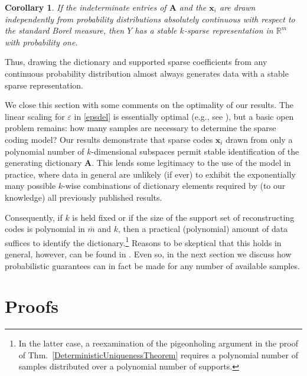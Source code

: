 \documentclass[journal, twocolumn]{IEEEtran}
\newtheorem{corollary}{Corollary}
\begin{document}
\begin{corollary}\label{ProbabilisticCor}
If the indeterminate entries of $\mathbf{A}$ and the $\mathbf{x}_i$ are drawn independently from probability distributions absolutely continuous with respect to the standard Borel measure, then $Y$ has a stable $k$-sparse representation in $\mathbb{R}^m$ with probability one.
\end{corollary}

Thus, drawing the dictionary and supported sparse coefficients from any continuous probability distribution almost always generates data with a stable sparse representation.


We close this section with some comments on the optimality of our results.  The linear scaling for $\varepsilon$ in \eqref{epsdel} is essentially optimal (e.g., see \cite{arias2013fundamental}), but a basic open problem remains: how many samples are necessary to determine the sparse coding model? 
Our results demonstrate that sparse codes $\mathbf{x}_i$ drawn from only a polynomial number of $k$-dimensional subspaces permit stable identification of the generating dictionary $\mathbf{A}$. 
This lends some legitimacy to the use of the model in practice, where data in general are unlikely (if ever) to exhibit the exponentially many possible $k$-wise combinations of dictionary elements required by (to our knowledge) all previously published results. 

Consequently, if $k$ is held fixed or if the size of the support set of reconstructing codes is polynomial in $\overline m$ and $k$, then a practical (polynomial) amount of data suffices to identify the dictionary.\footnote{In the latter case, a reexamination of the pigeonholing argument in the proof of Thm.~\ref{DeterministicUniquenessTheorem} requires a polynomial number of samples distributed over a polynomial number of supports.} Reasons to be skeptical that this holds in general, however, can be found in \cite{tillmann2014computational, Tillmann15}. Even so, in the next section we discuss how probabilistic guarantees can in fact be made for any number of available samples.

\section{Proofs}\label{DUT} %
\end{document}
